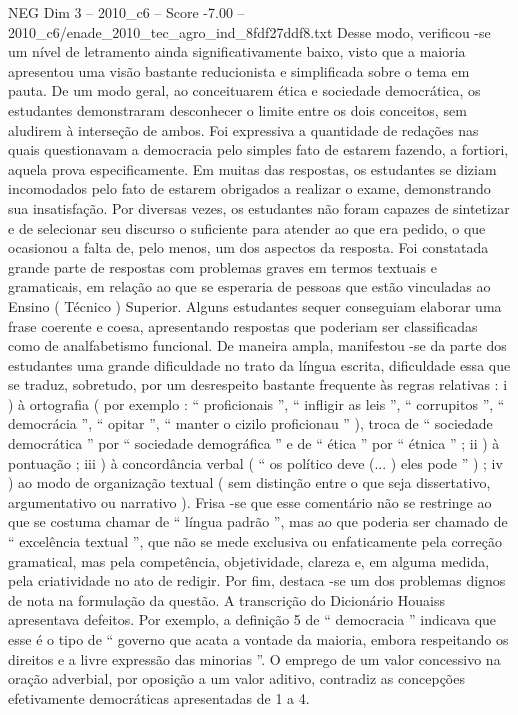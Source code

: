 \begin{textsample}{NEG Dim 3 – 2010\_c6 – Score -7.00 – 2010\_c6/enade\_2010\_tec\_agro\_ind\_8fdf27ddf8.txt}
Desse modo, verificou -se um nível de letramento ainda significativamente baixo, visto que a maioria apresentou uma visão bastante reducionista e simplificada sobre o tema em pauta.
De um modo geral, ao conceituarem ética e sociedade democrática, os estudantes demonstraram desconhecer o limite entre os dois conceitos, sem aludirem à interseção de ambos.
Foi expressiva a quantidade de redações nas quais questionavam a democracia pelo simples fato de estarem fazendo, a fortiori, aquela prova especificamente.
Em muitas das respostas, os estudantes se diziam incomodados pelo fato de estarem obrigados a realizar o exame, demonstrando sua insatisfação.
Por diversas vezes, os estudantes não foram capazes de sintetizar e de selecionar seu discurso o suficiente para atender ao que era pedido, o que ocasionou a falta de, pelo menos, um dos aspectos da resposta.
Foi constatada grande parte de respostas com problemas graves em termos textuais e gramaticais, em relação ao que se esperaria de pessoas que estão vinculadas ao Ensino ( Técnico ) Superior.
Alguns estudantes sequer conseguiam elaborar uma frase coerente e coesa, apresentando respostas que poderiam ser classificadas como de analfabetismo funcional.
De maneira ampla, manifestou -se da parte dos estudantes uma grande dificuldade no trato da língua escrita, dificuldade essa que se traduz, sobretudo, por um desrespeito bastante frequente às regras relativas : i ) à ortografia ( por exemplo : “ proficionais ”, “ infligir as leis ”, “ corrupitos ”, “ democrácia ”, “ opitar ”, “ manter o cizilo proficionau ” ), troca de “ sociedade democrática ” por “ sociedade demográfica ” e de “ ética ” por “ étnica ” ; ii ) à pontuação ; iii ) à concordância verbal ( “ os político deve (... ) eles pode ” ) ; iv ) ao modo de organização textual ( sem distinção entre o que seja dissertativo, argumentativo ou narrativo ).
Frisa -se que esse comentário não se restringe ao que se costuma chamar de “ língua padrão ”, mas ao que poderia ser chamado de “ excelência textual ”, que não se mede exclusiva ou enfaticamente pela correção gramatical, mas pela competência, objetividade, clareza e, em alguma medida, pela criatividade no ato de redigir.
Por fim, destaca -se um dos problemas dignos de nota na formulação da questão.
A transcrição do Dicionário Houaiss apresentava defeitos.
Por exemplo, a definição 5 de “ democracia ” indicava que esse é o tipo de “ governo que acata a vontade da maioria, embora respeitando os direitos e a livre expressão das minorias ”.
O emprego de um valor concessivo na oração adverbial, por oposição a um valor aditivo, contradiz as concepções efetivamente democráticas apresentadas de 1 a 4.

\end{textsample}
